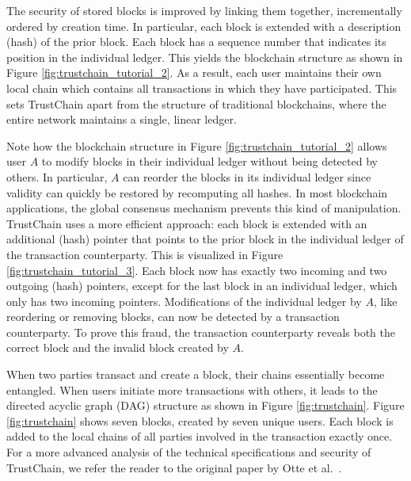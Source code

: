 The security of stored blocks is improved by linking them together, incrementally ordered by creation time.
In particular, each block is extended with a description (hash) of the prior block.
Each block has a sequence number that indicates its position in the individual ledger.
This yields the blockchain structure as shown in Figure \ref{fig:trustchain_tutorial_2}.
As a result, each user maintains their own local chain which contains all transactions in which they have participated.
This sets TrustChain apart from the structure of traditional blockchains, where the entire network maintains a single, linear ledger.

Note how the blockchain structure in Figure \ref{fig:trustchain_tutorial_2} allows user $ A $ to modify blocks in their individual ledger without being detected by others.
In particular, $ A $ can reorder the blocks in its individual ledger since validity can quickly be restored by recomputing all hashes.
In most blockchain applications, the global consensus mechanism prevents this kind of manipulation.
TrustChain uses a more efficient approach: each block is extended with an additional (hash) pointer that points to the prior block in the individual ledger of the transaction counterparty.
This is visualized in Figure \ref{fig:trustchain_tutorial_3}.
Each block now has exactly two incoming and two outgoing (hash) pointers, except for the last block in an individual ledger, which only has two incoming pointers.
Modifications of the individual ledger by $ A $, like reordering or removing blocks, can now be detected by a transaction counterparty.
To prove this fraud, the transaction counterparty reveals both the correct block and the invalid block created by $ A $.

When two parties transact and create a block, their chains essentially become entangled.
When users initiate more transactions with others, it leads to the directed acyclic graph (DAG) structure as shown in Figure \ref{fig:trustchain}.
Figure \ref{fig:trustchain} shows seven blocks, created by seven unique users.
Each block is added to the local chains of all parties involved in the transaction exactly once.
For a more advanced analysis of the technical specifications and security of TrustChain, we refer the reader to the original paper by Otte et al.~\cite{otte2017trustchain}.

